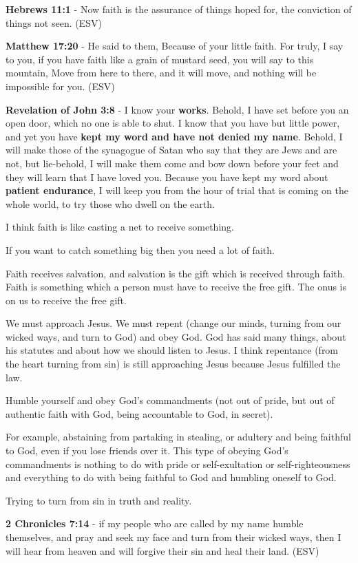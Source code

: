 \documentclass[11pt]{article}
\begin{document}
\textbf{Hebrews 11:1} - Now faith is the assurance of things hoped for, the conviction of things not seen. (ESV)

\textbf{Matthew 17:20} - He said to them, Because of your little faith. For truly, I say to you, if you have faith like a grain of mustard seed, you will say to this mountain, Move from here to there, and it will move, and nothing will be impossible for you. (ESV)

\textbf{Revelation of John 3:8} - I know your \textbf{works}. Behold, I have set before you an open door, which no one is able to shut. I know that you have but little power, and yet you have \textbf{kept my word and have not denied my name}.  Behold, I will make those of the synagogue of Satan who say that they are Jews and are not, but lie-behold, I will make them come and bow down before your feet and they will learn that I have loved you.  Because you have kept my word about \textbf{patient endurance}, I will keep you from the hour of trial that is coming on the whole world, to try those who dwell on the earth.

I think faith is like casting a net to receive something.

If you want to catch something big then you need a lot of faith.

Faith receives salvation, and salvation is the gift which is received through faith.
Faith is something which a person must have to receive the free gift.
The onus is on us to receive the free gift.

We must approach Jesus.
We must repent (change our minds, turning from our wicked ways, and turn to God) and obey God.
God has said many things, about his statutes and about how we should listen to Jesus.
I think repentance (from the heart turning from sin) is still approaching Jesus because Jesus fulfilled the law.

Humble yourself and obey God's commandments (not out of pride, but out of authentic faith with God, being accountable to God, in secret).

For example, abstaining from partaking in stealing, or adultery and being faithful to God, even if you lose friends over it.
This type of obeying God's commandments is nothing to do with pride or self-exultation or self-righteousness and everything to do with being faithful to God and humbling oneself to God.

Trying to turn from sin in truth and reality.

\textbf{2 Chronicles 7:14} -  if my people who are called by my name humble themselves, and pray and seek my face and turn from their wicked ways, then I will hear from heaven and will forgive their sin and heal their land.  (ESV)
\end{document}
